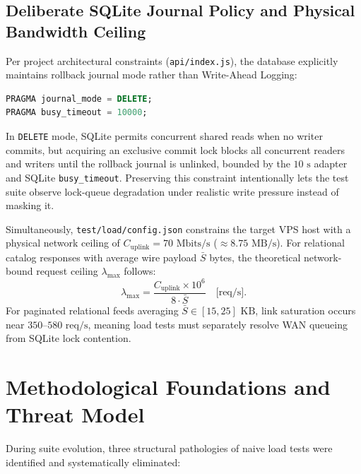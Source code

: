 \documentclass[11pt,letterpaper]{article}
\begin{document}
\subsection{Deliberate SQLite Journal Policy and Physical Bandwidth Ceiling}
Per project architectural constraints (\texttt{api/index.js}), the database explicitly maintains rollback journal mode rather than Write-Ahead Logging:
\begin{lstlisting}[language=SQL,caption={Active SQLite concurrency pragmas initialized at backend startup (\texttt{api/index.js}).}]
PRAGMA journal_mode = DELETE;
PRAGMA busy_timeout = 10000;
\end{lstlisting}
In \texttt{DELETE} mode, SQLite permits concurrent shared reads when no writer commits, but acquiring an exclusive commit lock blocks all concurrent readers and writers until the rollback journal is unlinked, bounded by the $10\text{ s}$ adapter and SQLite \texttt{busy\_timeout}. Preserving this constraint intentionally lets the test suite observe lock-queue degradation under realistic write pressure instead of masking it.

Simultaneously, \texttt{test/load/config.json} constrains the target VPS host with a physical network ceiling of $C_{\text{uplink}} = 70\text{ Mbits/s}$ ($\approx 8.75\text{ MB/s}$). For relational catalog responses with average wire payload $\bar{S}$ bytes, the theoretical network-bound request ceiling $\lambda_{\max}$ follows:
\begin{equation}
  \label{eq:bandwidth}
  \lambda_{\max} = \frac{C_{\text{uplink}} \times 10^{6}}{8 \cdot \bar{S}} \quad \text{[req/s]}.
\end{equation}
For paginated relational feeds averaging $\bar{S} \in [15, 25]\text{ KB}$, link saturation occurs near $350\text{--}580\text{ req/s}$, meaning load tests must separately resolve WAN queueing from SQLite lock contention.

\section{Methodological Foundations and Threat Model}

During suite evolution, three structural pathologies of naive load tests were identified and systematically eliminated:
\end{document}
